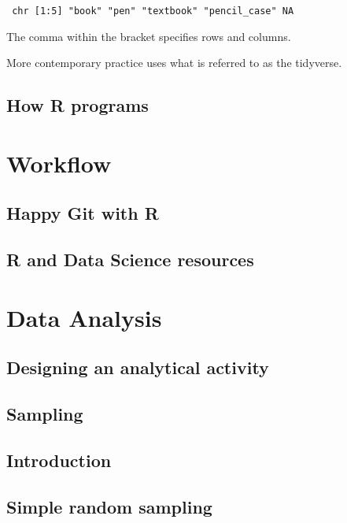 \documentclass[
  letterpaper,
  DIV=11,
  numbers=noendperiod]{scrreprt}
\begin{document}
\begin{verbatim}
 chr [1:5] "book" "pen" "textbook" "pencil_case" NA
\end{verbatim}

The comma within the bracket specifies rows and columns.

More contemporary practice uses what is referred to as the tidyverse.

\chapter{How R programs}\label{how-r-programs}

\part{Workflow}

\chapter{Happy Git with R}\label{happy-git-with-r}

\chapter{R and Data Science
resources}\label{r-and-data-science-resources}

\part{Data Analysis}

\chapter{Designing an analytical
activity}\label{designing-an-analytical-activity}

\chapter{Sampling}\label{sampling}

\chapter{Introduction}\label{introduction-1}

\chapter{Simple random sampling}\label{simple-random-sampling}
\end{document}
